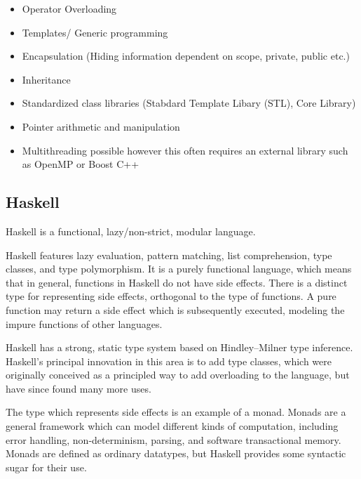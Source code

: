 \documentclass[a4paper,oneside]{report}
\begin{document}
	\begin{itemize}
	\item Operator Overloading
	\item Templates/ Generic programming
	\item Encapsulation (Hiding information dependent on scope, private, public etc.)
	\item Inheritance
	\item Standardized class libraries (Stabdard Template Libary (STL), Core Library)
	\item Pointer arithmetic and manipulation 
	\item Multithreading possible however this often requires an external library such as OpenMP or Boost C++
	\end{itemize}



	\subsection{Haskell}


	Haskell is a functional, lazy/non-strict, modular language.

	Haskell features lazy evaluation, pattern matching, list comprehension, type classes, and type polymorphism. It is a purely functional language, which means that in general, functions in Haskell do not have side effects. There is a distinct type for representing side effects, orthogonal to the type of functions. A pure function may return a side effect which is subsequently executed, modeling the impure functions of other languages.

	Haskell has a strong, static type system based on Hindley–Milner type inference. Haskell's principal innovation in this area is to add type classes, which were originally conceived as a principled way to add overloading to the language, but have since found many more uses.

	The type which represents side effects is an example of a monad. Monads are a general framework which can model different kinds of computation, including error handling, non-determinism, parsing, and software transactional memory. Monads are defined as ordinary datatypes, but Haskell provides some syntactic sugar for their use.
	
\end{document}
